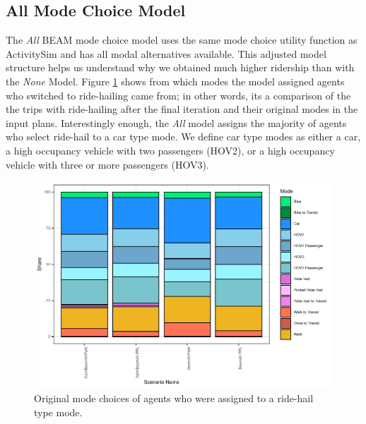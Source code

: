 \documentclass[fancy, masters]{byuthesis}
\begin{document}
\hypertarget{type3}{%
\subsection{All Mode Choice Model}\label{type3}}

The \emph{All} BEAM mode choice model uses the same mode choice utility function as ActivitySim and has all modal alternatives available. This adjusted model structure helps us understand why we obtained much higher ridership than with the \emph{None} Model. Figure \ref{fig:piechart} shows from which modes the model assigned agents who switched to ride-hailing came from; in other words, its a comparison of the the trips with ride-hailing after the final iteration and their original modes in the input plans. Interestingly enough, the \emph{All} model assigns the majority of agents who select ride-hail to a car type mode. We define car type modes as either a car, a high occupancy vehicle with two passengers (HOV2), or a high occupancy vehicle with three or more passengers (HOV3).

\begin{figure}

{\centering \includegraphics{thesis_files/figure-latex/piechart-1} 

}

\caption[Original mode choices of agents who were assigned to ride-hail.]{Original mode choices of agents who were assigned to a ride-hail type mode.}\label{fig:piechart}
\end{figure}
\end{document}
